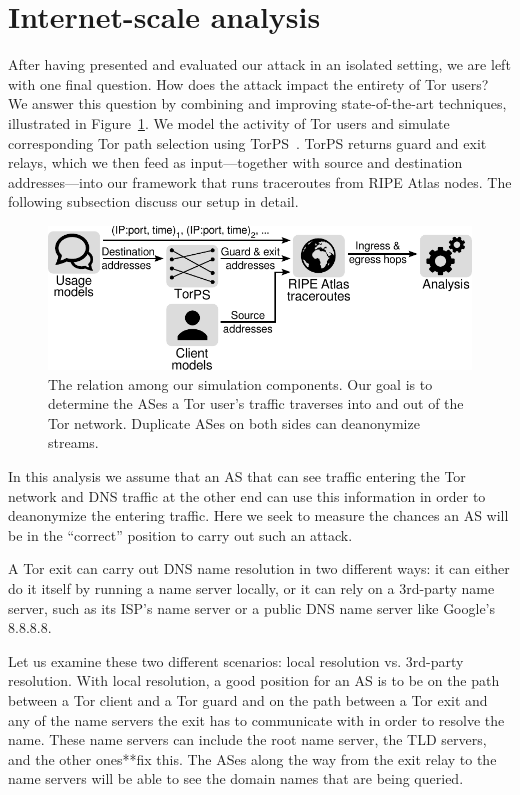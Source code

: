 \section{Internet-scale analysis}
\label{sec:internet-scale}
After having presented and evaluated our attack in an isolated setting, we are
left with one final question.  How does the attack impact the entirety of Tor
users?  We answer this question by combining and improving state-of-the-art
techniques, illustrated in Figure~\ref{fig:simulations}.  We model the activity
of Tor users and simulate corresponding Tor path selection using
TorPS~\cite{TorPS}.  TorPS returns guard and exit relays, which we then feed as
input---together with source and destination addresses---into our framework that
runs traceroutes from RIPE Atlas nodes.  The following subsection discuss our
setup in detail.

\begin{figure}[t]
	\centering
	\includegraphics[width=\linewidth]{figures/simulations.pdf}
	\caption{The relation among our simulation components.  Our goal is to
	determine the ASes a Tor user's traffic traverses into and out of the Tor
	network.  Duplicate ASes on both sides can deanonymize streams.}
	\label{fig:simulations}
\end{figure}

In this analysis we assume that an AS that can see traffic entering the Tor network and 
DNS traffic at the other end can use this information in order to deanonymize the 
entering traffic. Here we seek to measure the chances an AS will be in the ``correct'' 
position to carry out such an attack.

A Tor exit can carry out DNS name resolution in two different ways: it can either do it
itself by running a name server locally, or it can rely on a 3rd-party name server, 
such as its ISP's name server or a public DNS name server like Google's 8.8.8.8.

Let us examine these two different scenarios: local resolution vs. 3rd-party 
resolution. With local resolution, a good position for an AS is to be on the path between 
a Tor client and a Tor guard and on the path between a Tor exit and any of the name 
servers the exit has to communicate with in order to resolve the name. These name servers 
can include the root name server, the TLD servers, and the other ones**fix this. The ASes 
along the way from the exit relay to the name servers will be able to see the domain 
names that are being queried.


